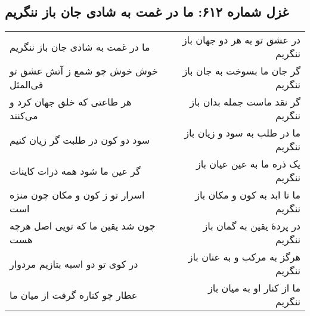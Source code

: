 \begin{center}
\section*{غزل شماره ۶۱۲: ما در غمت به شادی جان باز ننگریم}
\label{sec:612}
\begin{longtable}{l p{0.5cm} r}
ما در غمت به شادی جان باز ننگریم
&&
در عشق تو به هر دو جهان باز ننگریم
\\
خوش خوش چو شمع ز آتش عشق تو فی‌المثل
&&
گر جان ما بسوخت به جان باز ننگریم
\\
هر طاعتی که خلق جهان کرد و می‌کنند
&&
گر نقد ماست جمله بدان باز ننگریم
\\
سود دو کون در طلبت گر زیان کنیم
&&
ما در طلب به سود و زیان باز ننگریم
\\
گر عین ما شود همه ذرات کاینات
&&
یک ذره ما به عین عیان باز ننگریم
\\
اسرار تو ز کون و مکان چون منزه است
&&
ما تا ابد به کون و مکان باز ننگریم
\\
چون شد یقین ما که تویی اصل هرچه هست
&&
در پردهٔ یقین به گمان باز ننگریم
\\
در کوی تو دو اسبه بتازیم مردوار
&&
هرگز به مرکب و به عنان باز ننگریم
\\
عطار چو کناره گرفت از میان ما
&&
ما از کنار او به میان باز ننگریم
\\
\end{longtable}
\end{center}

